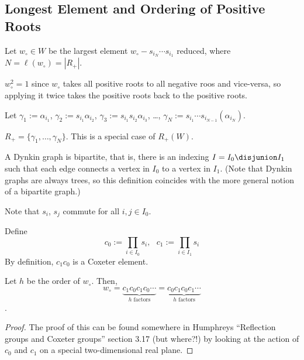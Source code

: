 \documentclass[11pt,leqno,oneside]{amsbook}
\numberwithin{thm}{section}
\renewcommand{\roots}{R} %
\begin{document}
\subsection{Longest Element and Ordering of Positive Roots}
\begin{defn}
  Let \(w_\circ \in W\) be the largest element \(w_\circ - s_{i_N}
  \cdots s_{i_1}\) reduced, where \(N = \ell(w_\circ) = |\roots_+|\). 
\end{defn}
\begin{rmk}
    \(w_\circ^2 = 1\) since \(w_\circ\) takes all positive roots to
    all negative roos and vice-versa, so applying it twice takes the
    positive roots back to the positive roots. 
\end{rmk}
\begin{defn}
  Let \(\gamma_1 := \alpha_{i_1}\), \(\gamma_2 := s_{i_1}
  \alpha_{i_2}\), \(\gamma_3 := s_{i_1} s_{i_2} \alpha_{i_3}\), \ldots,
  \(\gamma_N := s_{i_1} \cdots s_{i_{N-1}}(\alpha_{i_N})\).
\end{defn}
\begin{prop}
  \(\roots_+ = \{\gamma_1, \ldots, \gamma_N\}\). This is a special case of
  \(\roots_+(W)\). 
\end{prop}
\begin{prop}
  A Dynkin graph is bipartite, that is, there is an indexing \(I = I_0
  \disjunion I_1\) such that each edge connects a vertex in \(I_0\) to
  a vertex in \(I_1\). (Note that Dynkin graphs are always trees, so
  this definition coincides with the more general notion of a
  bipartite graph.)
\end{prop}
\begin{rmk}
  Note that \(s_i\), \(s_j\) commute for all \(i,j \in I_0\).
\end{rmk}
\begin{defn}
  Define \[
    c_0 := \prod_{i \in I_0} s_i, \ \ \ c_1 := \prod_{i \in I_1} s_i
  \]
  By definition, \(c_1 c_0\) is a Coxeter element.
\end{defn}
\begin{prop}
  Let \(h\) be the order of \(w_\circ\). Then, \[
w_\circ =
  \underbrace{c_1 c_0 c_1 c_0 \cdots}_{h \text{ factors}} =
  \underbrace{c_0 c_1 c_0 c_1 \cdots}_{h \text{ factors}}
  \].
\end{prop}
\begin{proof}
  The proof of this can be found somewhere in Humphreys ``Reflection
  groups and Coxeter groups'' section 3.17 (but
  where?!) by looking at the action of \(c_0\) and \(c_1\) on a
  special two-dimensional real plane.
\end{proof}
\end{document}
